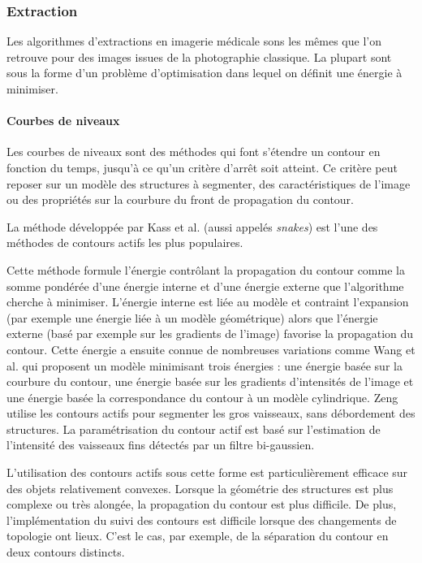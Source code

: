     \subsubsection{Extraction}

      Les algorithmes d'extractions en imagerie médicale sons les mêmes que l'on retrouve pour des images issues de la photographie classique. La plupart sont sous la forme d'un problème d'optimisation dans lequel on définit une énergie à minimiser.

      \paragraph{Courbes de niveaux} 
      Les courbes de niveaux sont des méthodes qui font s'étendre un contour en fonction du temps, jusqu'à ce qu'un critère d'arrêt soit atteint. Ce critère peut reposer sur un modèle des structures à segmenter, des caractéristiques de l'image ou des propriétés sur la courbure du front de propagation du contour.

      La méthode développée par Kass et al. \cite{Kass1988_snakes} (aussi appelés \textit{snakes}) est l'une des méthodes de contours actifs les plus populaires. 
      
      Cette méthode formule l'énergie contrôlant la propagation du contour comme la somme pondérée d'une énergie interne et d'une énergie externe que l'algorithme cherche à minimiser. L'énergie interne est liée au modèle et contraint l'expansion (par exemple une énergie liée à un modèle géométrique) alors que l'énergie externe (basé par exemple sur les gradients de l'image) favorise la propagation du contour. Cette énergie a ensuite connue de nombreuses variations comme Wang et al. \cite{Wang2012_vessel_level_set} qui proposent un modèle minimisant trois énergies : une énergie basée sur la courbure du contour, une énergie basée sur les gradients d'intensités de l'image et une énergie basée la correspondance du contour à un modèle cylindrique. Zeng \cite{Zeng2018_liver_hybrid_active_contour_region_growing} utilise les contours actifs pour segmenter les gros vaisseaux, sans débordement des structures. La paramétrisation du contour actif est basé sur l'estimation de l'intensité des vaisseaux fins détectés par un filtre bi-gaussien.

      L'utilisation des contours actifs sous cette forme est particulièrement efficace sur des objets relativement convexes. Lorsque la géométrie des structures est plus complexe ou très alongée, la propagation du contour est plus difficile. De plus, l'implémentation du suivi des contours est difficile lorsque des changements de topologie ont lieux. C'est le cas, par exemple, de la séparation du contour en deux contours distincts.
      
